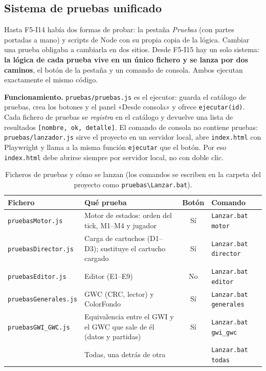 \subsection{Sistema de pruebas unificado}
\label{sec:F5I15Pruebas}

Hasta F5-I14 había dos formas de probar: la pestaña \emph{Pruebas} (con partes portadas a mano) y scripts de Node con su propia copia de la lógica. Cambiar una prueba obligaba a cambiarla en dos sitios. Desde F5-I15 hay un solo sistema: \textbf{la lógica de cada prueba vive en un único fichero y se lanza por dos caminos}, el botón de la pestaña y un comando de consola. Ambos ejecutan exactamente el mismo código.

\textbf{Funcionamiento.} \texttt{pruebas/pruebas.js} es el ejecutor: guarda el catálogo de pruebas, crea los botones y el panel «Desde consola» y ofrece \texttt{ejecutar(id)}. Cada fichero de pruebas se \emph{registra} en el catálogo y devuelve una lista de resultados \texttt{[nombre, ok, detalle]}. El comando de consola no contiene pruebas: \texttt{pruebas/lanzador.js} sirve el proyecto en un servidor local, abre \texttt{index.html} con Playwright y llama a la misma función \texttt{ejecutar} que el botón. Por eso \texttt{index.html} debe abrirse siempre por servidor local, no con doble clic.

\begin{table}[H]
	\centering
	\begin{tabularx}{\textwidth}{l >{\RaggedRight\arraybackslash}X c l}
		\toprule
		\textbf{Fichero} & \textbf{Qué prueba} & \textbf{Botón} & \textbf{Comando} \\
		\midrule
		\texttt{pruebasMotor.js} & Motor de estados: orden del tick, M1--M4 y jugador & Sí & \texttt{Lanzar.bat motor} \\
		\texttt{pruebasDirector.js} & Carga de cartuchos (D1--D3); sustituye el cartucho cargado & Sí & \texttt{Lanzar.bat director} \\
		\texttt{pruebasEditor.js} & Editor (E1--E9) & No & \texttt{Lanzar.bat editor} \\
		\texttt{pruebasGenerales.js} & GWC (CRC, lector) y ColorFondo & Sí & \texttt{Lanzar.bat generales} \\
		\texttt{pruebasGWI\_GWC.js} & Equivalencia entre el GWI y el GWC que sale de él (datos y partidas) & Sí & \texttt{Lanzar.bat gwi\_gwc} \\
		& Todas, una detrás de otra & & \texttt{Lanzar.bat todas} \\
		\bottomrule
	\end{tabularx}
	\caption{Ficheros de pruebas y cómo se lanzan (los comandos se escriben en la carpeta del proyecto como \texttt{pruebas\textbackslash Lanzar.bat}).}
\end{table}

